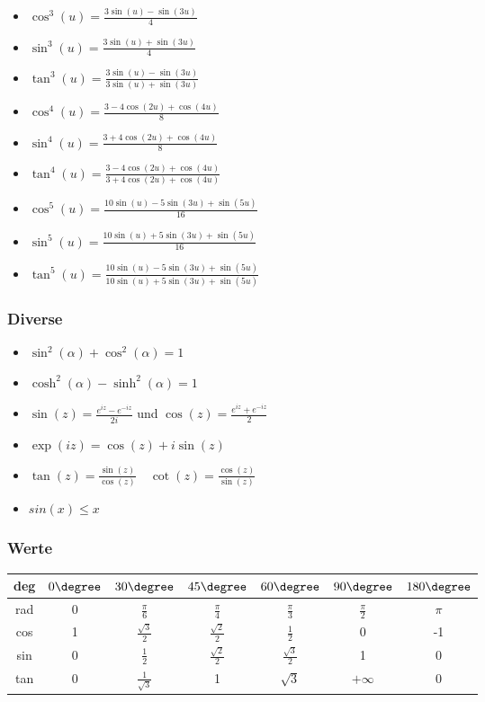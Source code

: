 \documentclass[7pt,landscape, margin = 0.1mm]{article}
\begin{document}
\begin{multicols}{4}
\begin{flushleft}
\begin{itemize}
\item $\cos^3(u) = \frac{3 \sin(u)-\sin(3u)}{4}$
\item $\sin^3(u) = \frac{3 \sin(u)+\sin(3u)}{4}$
\item $\tan^3(u) = \frac{3 \sin(u)-\sin(3u)}{3 \sin(u)+\sin(3u)}$ 

\item $\cos^4(u) = \frac{3- 4 \cos(2u) + \cos(4u)}{8}$
\item $\sin^4(u) = \frac{3+ 4 \cos(2u) + \cos(4u)}{8}$
\item $\tan^4(u) = \frac{3- 4 \cos(2u) + \cos(4u)}{3+4 \cos(2u) + \cos(4u)}$
 
\item $\cos^5(u) = \frac{10 \sin(u) - 5 \sin(3u)+ \sin(5u)}{16}$
\item $\sin^5(u) = \frac{10 \sin(u) + 5 \sin(3u)+ \sin(5u)}{16}$
\item $\tan^5(u) = \frac{10 \sin(u) - 5 \sin(3u)+ \sin(5u)}{10 \sin(u) + 5 \sin(3u)+ \sin(5u)}$ 
\end{itemize}

\subsubsection{Diverse}

\begin{itemize}
 \item $\sin^2(\alpha) + \cos^2(\alpha) = 1$
 \item $\cosh^2(\alpha) - \sinh^2(\alpha) = 1$
 \item $\sin(z) = \frac{e^{iz} - e^{-iz}}{2i}$ und $\cos(z) = \frac{e^{iz} + e^{-iz}}{2}$
 \item $\exp (iz) = \cos(z) + i \sin(z)$
 \item $\tan(z)=\frac{\sin(z)}{\cos(z)}\quad \cot(z)=\frac{\cos(z)}{\sin(z)}$
 \item $sin(x)\leq x$
\end{itemize}
\begin{center} 
\subsubsection{Werte}
 \begin{tabular}{c|cccccc}
  deg& $0 \degree $ & $30 \degree $ & $45 \degree $ & $60 \degree $ & $90 \degree $ & $180 \degree $ \\
  \hline
  rad & 0 & $\frac{\pi}{6}$ & $\frac{\pi}{4}$ & $\frac{\pi}{3}$ & $\frac{\pi}{2}$ & $\pi$ \\
  cos & 1 & $\frac{\sqrt{3}}{2}$ & $\frac{\sqrt{2}}{2}$ & $\frac{1}{2}$ & 0 & -1 \\
  sin & 0 & $\frac{1}{2}$ & $\frac{\sqrt{2}}{2}$ & $\frac{\sqrt{3}}{2}$ & 1 & 0 \\
  tan & 0 & $\frac{1}{\sqrt{3}}$ & 1 & $\sqrt{3}$ & $+\infty$ & 0 \\
 \end{tabular}
\end{center} 

\end{flushleft}
\end{multicols}
\end{document}
